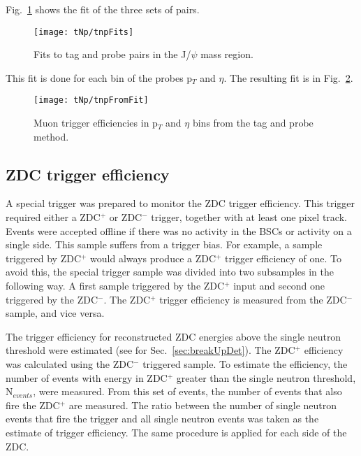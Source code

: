       Fig.~\ref{fig:tnpFitPlot} shows the fit of the three sets of pairs. 
      \begin{figure}[!Hh]
        \centering
        \texttt{[image: tNp/tnpFits]}
        \caption{Fits to tag and probe pairs in the J/$\psi$ mass region.}
        \label{fig:tnpFitPlot}
      \end{figure}
      This fit is done for each bin of the probes p$_{T}$ and $\eta$.
      The resulting fit is in Fig.~\ref{fig:tnpTrigMap}.
      \begin{figure}[!Hhbt]
        \centering
        \texttt{[image: tNp/tnpFromFit]}
        \caption{Muon trigger efficiencies in p$_{T}$ and $\eta$ bins from 
          the tag and probe method.}
        \label{fig:tnpTrigMap}
      \end{figure}

    \subsection{ZDC trigger efficiency}
      A special trigger was prepared to monitor the ZDC trigger efficiency. 
      This trigger required either a ZDC$^{+}$ or ZDC$^{-}$ trigger, together with at 
        least one pixel track. 
      Events were accepted offline if there was no activity in the BSCs or 
        activity on a single side. 
      This sample suffers from a trigger bias. 
      For example, a sample triggered by ZDC$^{+}$ would always produce a ZDC$^{+}$ 
        trigger efficiency of one. 
      To avoid this, the special trigger sample was divided into two 
        subsamples in the following way. 
      A first sample triggered by the ZDC$^{+}$ input and second one triggered by 
        the ZDC$^{-}$. 
      The ZDC$^{+}$ trigger efficiency is measured from the ZDC$^{-}$ sample, and vice 
        versa.

      The trigger efficiency for reconstructed ZDC energies above the
        single neutron threshold were estimated (see for Sec.~\ref{sec:breakUpDet}).
      The ZDC$^{+}$ efficiency was calculated using the ZDC$^{-}$ triggered 
        sample.
      To estimate the efficiency, the number of events with energy in 
        ZDC$^{+}$ greater than the single neutron threshold, N$_{events}$, 
        were measured.
      From this set of events, the number of events that also fire the 
        ZDC$^{+}$ are measured.
      The ratio between the number of single neutron events that fire the 
        trigger and all single neutron events was taken as the estimate of 
        trigger efficiency. 
      The same procedure is applied for each side of the ZDC. 

